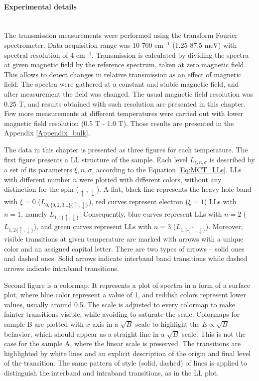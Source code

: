 \documentclass[titlepage,a4paper]{book}
\newcommand{\wciecie}{\quad\phantom{v}}
\newcommand{\myparagraph}[1]{\paragraph{#1}\mbox{}\\}
\begin{document}
\myparagraph{Experimental details}
\wciecie
The transmission measurements were performed using the transform Fourier spectrometer. Data acquisition range was 10-700 cm$^{-1}$ (1.25-87.5 meV) with spectral resolution of 4 cm$^{-1}$. Transmission is calculated by dividing the spectra at given magnetic field by the reference spectrum, taken at zero magnetic field. This allows to detect changes in relative transmission as an effect of magnetic field. The spectra were gathered at a constant and stable magnetic field, and after measurement the field was changed. The usual magnetic field resolution was 0.25 T, and results obtained with such resolution are presented in this chapter. Few more measurements at different temperatures were carried out with lower magnetic field resolution (0.5 T - 1.0 T). Those results are presented in the Appendix \ref{Appendix_bulk}.

The data in this chapter is presented as three figures for each temperature. The first figure presents a LL structure of the sample. Each level $L_{\xi,n,\sigma}$ is described by a set of its parameters $\xi,n,\sigma$, according to the Equation \ref{Eq:MCT_LLs}. LLs with different number $n$ were plotted with different colors, without any distinction for the spin ($\uparrow,\downarrow$). A flat, black line represents the heavy hole band with $\xi = 0$ ($L_{0,\{0,2,3...\}\{\uparrow,\downarrow\}}$), red curves represent electron ($\xi = 1$) LLs with $n = 1$, namely $L_{1,1\{\uparrow,\downarrow\}}$. Consequently, blue curves represent LLs with $n = 2$ ($L_{1,2\{\uparrow,\downarrow\}}$), and green curves represent LLs with $n = 3$ ($L_{1,3\{\uparrow,\downarrow\}}$). Moreover, visible transitions at given temperature are marked with arrows with a unique color and an assigned capital letter. There are two types of arrows -- solid ones and dashed ones. Solid arrows indicate interband band transitions while dashed arrows indicate intraband transitions. 

Second figure is a colormap. It represents a plot of spectra in a form of a surface plot, where blue color represent a value of 1, and reddish colors represent lower values, usually around 0.5. The scale is adjusted to every colormap to make fainter transitions visible, while avoiding to saturate the scale. Colormaps for sample B are plotted with $x$-axis in a $\sqrt{B}$ scale to highlight the $E \propto \sqrt{B}$ behavior, which should appear as a straight line in a $\sqrt{B}$ scale. This is not the case for the sample A, where the linear scale is preserved. The transitions are highlighted by white lines and an explicit description of the origin and final level of the transition. The same pattern of style (solid, dashed) of lines is applied to distinguish the interband and intraband transitions, as in the LL plot. 
\end{document}
